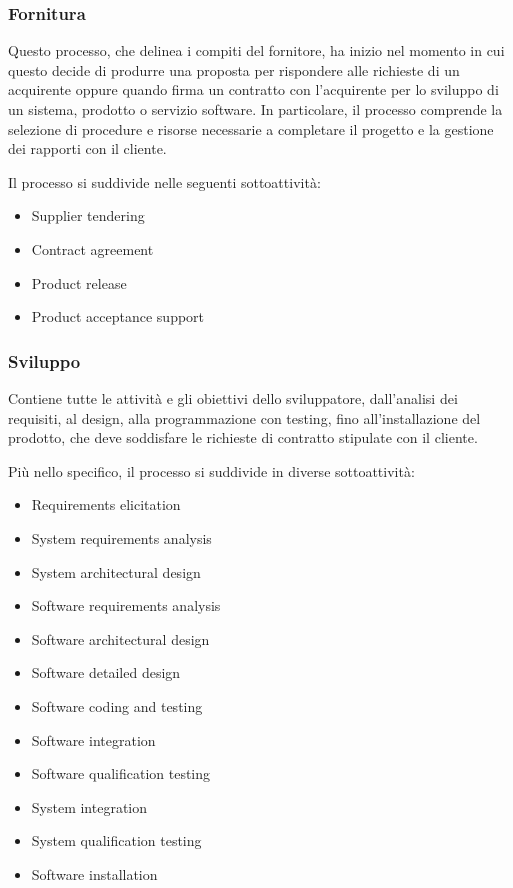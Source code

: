 \subsubsection{Fornitura}
Questo processo, che delinea i compiti del fornitore, ha inizio nel momento in cui questo decide di produrre una proposta per rispondere alle richieste di un acquirente oppure quando firma un contratto con l'acquirente per lo sviluppo di un sistema, prodotto o servizio software. In particolare, il processo comprende la selezione di procedure e risorse necessarie a completare il progetto e la gestione dei rapporti con il cliente.
\par Il processo si suddivide nelle seguenti sottoattività:
\begin{itemize}
    \item Supplier tendering
    \item Contract agreement
    \item Product release
    \item Product acceptance support
\end{itemize}
\subsubsection{Sviluppo}
Contiene tutte le attività e gli obiettivi dello sviluppatore, dall'analisi dei requisiti, al design, alla programmazione con testing, fino all'installazione del prodotto, che deve soddisfare le richieste di contratto stipulate con il cliente.
\par Più nello specifico, il processo si suddivide in diverse sottoattività:
\begin{itemize}
    \item Requirements elicitation
    \item System requirements analysis
    \item System architectural design
    \item Software requirements analysis
    \item Software architectural design
    \item Software detailed design
    \item Software coding and testing
    \item Software integration
    \item Software qualification testing
    \item System integration
    \item System qualification testing
    \item Software installation
\end{itemize}
